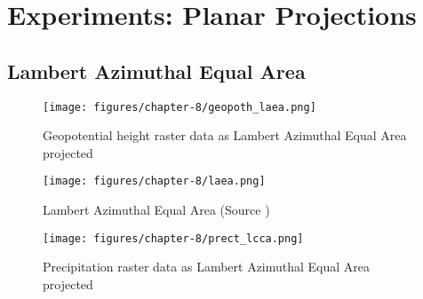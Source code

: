 
\section{Experiments: Planar Projections}

\subsection{Lambert Azimuthal Equal Area}
\begin{figure}[H]
    \centering
    \begin{minipage}{0.30\textwidth}
        \centering
        \texttt{[image: figures/chapter-8/geopoth\_laea.png]}
        \caption{ Geopotential height raster data as Lambert Azimuthal Equal Area projected}
        \label{fig:laea_geopoth_raster}
    \end{minipage}\hfill
    \begin{minipage}{0.30\textwidth}
        \centering
        \texttt{[image: figures/chapter-8/laea.png]}
        \caption{Lambert Azimuthal Equal Area (Source \cite{PROJ_SITE})}
        \label{fig:laea_proj}
    \end{minipage}\hfill
    \begin{minipage}{0.30\textwidth}
        \centering
        \texttt{[image: figures/chapter-8/prect\_lcca.png]}
        \caption{Precipitation raster data as Lambert Azimuthal Equal Area projected}
        \label{fig:laea_prect_raster}
    \end{minipage}\hfill
\end{figure}


